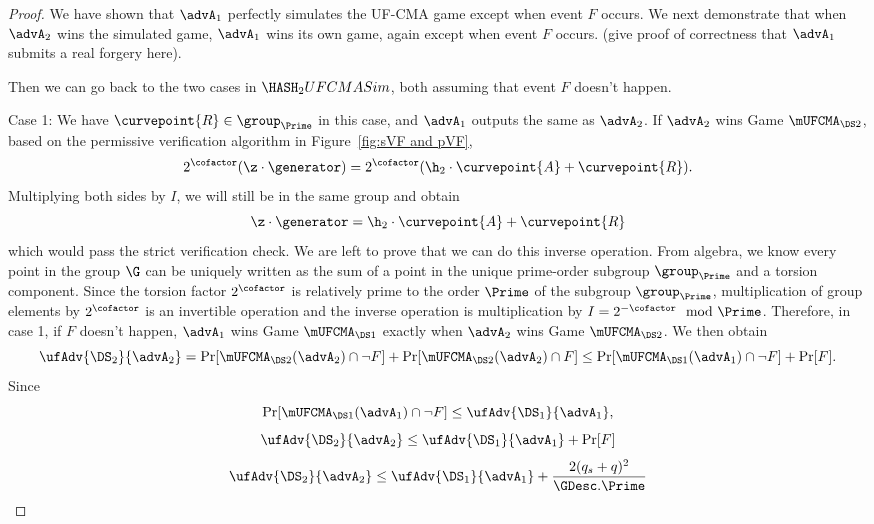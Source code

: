 \begin{proof}
	{\color{red} We have shown that $\advA_1$ perfectly simulates the UF-CMA game except when event $F$ occurs. We next demonstrate that when $\advA_2$ wins the simulated game, $\advA_1$ wins its own game, again except when event $F$ occurs. (give proof of correctness that $\advA_1$ submits a real forgery here).}
	
	Then we can go back to the two cases in $\HASH_2UFCMASim$, both assuming that event $F$ doesn't happen.
	
	Case 1: We have $\curvepoint{R} \in \group_{\Prime}$ in this case, and $\advA_1$ outputs the same as $\advA_2$. If $\advA_2$ wins Game $\mUFCMA_{\DS2}$, based on the permissive verification algorithm in Figure~\ref{fig:sVF and pVF}, 
	\[2^\cofactor(\z \cdot  \generator) = 2^\cofactor (\h_2 \cdot \curvepoint{A} + \curvepoint{R}).\]
	Multiplying both sides by $I$, we will still be in the same group and obtain
	\[\z \cdot  \generator = \h_2 \cdot \curvepoint{A} + \curvepoint{R}\] which would pass the strict verification check. We are left to prove that we can do this inverse operation. From algebra, we know every point in the group $\G$ can be uniquely written as the sum of a point in the unique prime-order subgroup $\group_{\Prime}$ and a torsion component. Since the torsion factor $2^\cofactor$ is relatively prime to the order $\Prime$ of the subgroup $\group_{\Prime}$, multiplication of group elements by $2^\cofactor$ is an invertible operation and the inverse operation is multiplication by $I = 2^{-\cofactor} \mod \Prime$. 
	Therefore, in case 1, if $F$ doesn't happen, $\advA_1$ wins Game $\mUFCMA_{\DS1}$ exactly when $\advA_2$ wins Game $\mUFCMA_{\DS2}$. We then obtain
	\[\ufAdv{\DS_2}{\advA_2} = \Pr[\mUFCMA_{\DS2}(\advA_2) \cap \neg F] +  \Pr[\mUFCMA_{\DS2}(\advA_2) \cap F] \leq \Pr[\mUFCMA_{\DS1}(\advA_1) \cap \neg F] + \Pr[F] .\] 
	Since 
	\[ \Pr[\mUFCMA_{\DS1}(\advA_1) \cap \neg F] \leq \ufAdv{\DS_1}{\advA_1} ,\]
	\[\ufAdv{\DS_2}{\advA_2} \leq \ufAdv{\DS_1}{\advA_1} + \Pr[F]\]
	\[\ufAdv{\DS_2}{\advA_2} \leq \ufAdv{\DS_1}{\advA_1} +  \frac{2(q_s + q)^2}{\GDesc.\Prime}\]
	

\end{proof}
